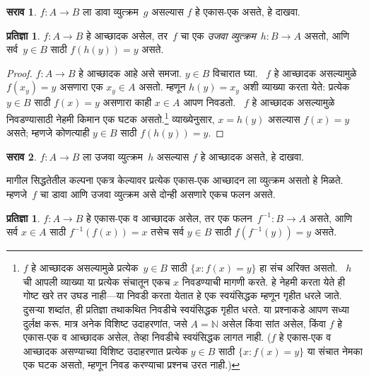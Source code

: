 \documentclass[11pt,a4paper,openany]{book}
\theoremstyle{definition}
\newtheorem{prop}[defn]{प्रतिज्ञा}
\newtheorem{prob}{सराव}[chapter]
\newenvironment{explain}{}{}
\newcommand{\Setabs}[2]{\{#1:#2\}}
\newcommand{\Nat}{\mathbb{N}}
\begin{document}
\begin{prob}
$f\colon A \to B$ ला डावा व्युत्क्रम~$g$ असल्यास $f$ हे
एकास-एक असते, हे दाखवा.
\end{prob}

\begin{prop}
    $f\colon A \to B$ हे आच्छादक असेल, तर~$f$ चा एक
    \emph{उजवा व्युत्क्रम}~$h\colon B \to A$ असतो, आणि सर्व~$y \in B$
    साठी $f(h(y)) = y$ असते.
\end{prop}

\begin{proof}
$f\colon A \to B$ हे आच्छादक आहे असे समजा. $y \in B$ विचारात घ्या.
~$f$ हे आच्छादक असल्यामुळे $f(x_y) = y$ असणारा एक $x_y \in A$
असतो. म्हणून $h(y) = x_y$ अशी व्याख्या करता येते: प्रत्येक $y \in B$
साठी $f(x) = y$ असणारा काही $x \in A$ आपण निवडतो. ~$f$ हे
आच्छादक असल्यामुळे निवडण्यासाठी नेहमी किमान एक घटक असतो.\footnote{
$f$ हे आच्छादक असल्यामुळे प्रत्येक~$y \in B$ साठी
$\Setabs{x}{f(x) = y}$ हा संच अरिक्त असतो. ~$h$ ची आपली व्याख्या
या प्रत्येक संचातून एकच $x$ निवडण्याची मागणी करते. हे नेहमी करता येते
ही गोष्ट खरे तर उघड नाही---या निवडी करता येतात हे एक स्वयंसिद्धक म्हणून
गृहीत धरले जाते. दुसऱ्या शब्दांत, ही प्रतिज्ञा तथाकथित निवडीचे स्वयंसिद्धक
गृहीत धरते. या प्रश्नाकडे आपण सध्या दुर्लक्ष करू.
मात्र अनेक विशिष्ट उदाहरणांत, जसे $A = \Nat$ असेल किंवा सांत असेल,
किंवा $f$ हे एकास-एक व आच्छादक असेल, तेव्हा निवडीचे स्वयंसिद्धक लागत नाही.
($f$ हे एकास-एक व आच्छादक असण्याच्या विशिष्ट उदाहरणात प्रत्येक $y \in B$
साठी $\Setabs{x}{f(x) = y}$ या संचात नेमका एक घटक असतो,
म्हणून निवड करण्याचा प्रश्नच उरत नाही.)}
व्याख्येनुसार, $x = h(y)$ असल्यास $f(x) = y$ असते; म्हणजे कोणत्याही
$y \in B$ साठी $f(h(y)) = y$.
\end{proof}

\begin{prob}
$f\colon A \to B$ ला उजवा व्युत्क्रम~$h$ असल्यास $f$ हे
आच्छादक असते, हे दाखवा.
\end{prob}

\begin{explain}
  मागील सिद्धतेतील कल्पना एकत्र केल्यावर प्रत्येक एकास-एक आच्छादन ला
  व्युत्क्रम असतो हे मिळते. म्हणजे~$f$ चा डावा आणि उजवा व्युत्क्रम
  असे दोन्ही असणारे एकच फलन असते.
\end{explain}

\begin{prop}\label{sfr:fun:inv:prop:bijection-inverse}
$f\colon A \to B$ हे एकास-एक व आच्छादक असेल, तर एक
फलन~$f^{-1}\colon B \to A$ असते, आणि सर्व $x \in A$ साठी
$f^{-1}(f(x)) = x$ तसेच सर्व $y \in B$ साठी $f(f^{-1}(y)) = y$ असते.
\end{prop}
\end{document}
